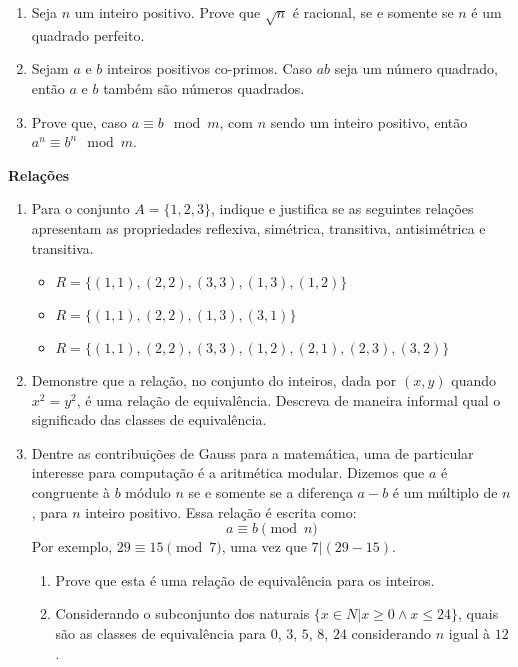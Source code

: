 \documentclass[]{book}
\theoremstyle{definition}
\begin{document}
\begin{enumerate}
\item\label{caushw} Seja $n$ um inteiro positivo. Prove que $\sqrt n$ é racional, se e somente se $n$ é um quadrado perfeito.

\item\label{caushw} Sejam $a$ e $b$ inteiros positivos co-primos. Caso $ab$ seja um número quadrado, então $a$ e $b$ também são números quadrados.

\item \label{caushw} Prove que, caso $a \equiv b \mod m$, com $n$ sendo um inteiro positivo, então $a^{n} \equiv b^{n} \mod m$.


\end{enumerate}


\textbf{Relações}
\begin{enumerate}
\item \label{caushw} Para o conjunto $A=\{1, 2, 3\}$, indique e justifica se as seguintes relações apresentam as propriedades reflexiva, simétrica, transitiva, antisimétrica e transitiva.

\begin{itemize}
\item $R = \{ (1, 1), (2,2), (3, 3), (1, 3), (1, 2)\}$
\item $R = \{ (1, 1), (2,2), (1, 3), (3, 1)\}$
\item $R = \{ (1, 1), (2,2), (3, 3), (1, 2), (2, 1), (2, 3), (3, 2)\}$
\end{itemize}

\item \label{caushw} Demonstre que a relação, no conjunto do inteiros, dada por $(x,y)$ quando $x^{2}=y^{2}$, é uma relação de equivalência. Descreva de maneira informal qual o significado das classes de equivalência.


\item \label{caushw} Dentre as contribui\c{c}\~{o}es de Gauss para a matem\'{a}tica, uma de particular interesse para computa\c{c}\~{a}o \'{e} a aritm\'{e}tica modular. Dizemos que $a$ \'{e} congruente \`{a} $b$ m\'{o}dulo $n$ se e somente se a diferen\c{c}a $a-b$ \'{e} um m\'{u}ltiplo de $n$, para $n$ inteiro positivo. Essa rela\c{c}\~{a}o \'{e} escrita como: $$a \equiv b \pmod{n}$$  Por exemplo, $29 \equiv 15 \pmod{7}$, uma vez que $7|(29-15)$.

\begin{enumerate}
\item Prove que esta \'{e} uma rela\c{c}\~{a}o de equival\^{e}ncia para os inteiros.
\item Considerando o subconjunto dos naturais $\{x \in N | x \geq 0  \land x \leq 24\}$, quais são as classes de equival\^{e}ncia para $0$, $3$, $5$, $8$, $24$ considerando $n$ igual \`{a} $12$.
\end{enumerate}


\end{enumerate}
\end{document}
